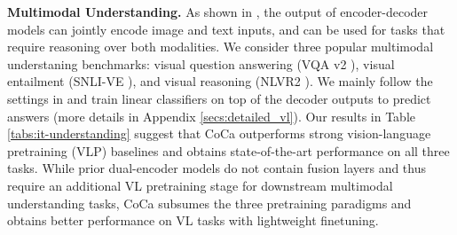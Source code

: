 \textbf{Multimodal Understanding.} 
As shown in \cite{wang2021simvlm},
the output of encoder-decoder models can jointly encode image and text inputs, and can be used for tasks that require reasoning over both modalities.
We consider three popular multimodal understaning benchmarks: visual question answering (VQA v2 \citep{goyal2017making}), visual entailment (SNLI-VE \citep{xie2019visual}), and visual reasoning (NLVR2 \citep{suhr2018corpus}).
We mainly follow the settings in \cite{wang2021simvlm} and train linear classifiers on top of the decoder outputs to predict answers (more details in Appendix \ref{secs:detailed_vl}).
Our results in Table \ref{tabs:it-understanding} suggest that CoCa outperforms strong vision-language pretraining (VLP) baselines and obtains state-of-the-art performance on all three tasks.
While prior dual-encoder models \cite{radford2021learning,yuan2021florence} do not contain fusion layers and thus require an additional VL pretraining stage for downstream multimodal understanding tasks,
CoCa subsumes the three pretraining paradigms and obtains better performance on VL tasks with lightweight finetuning.

